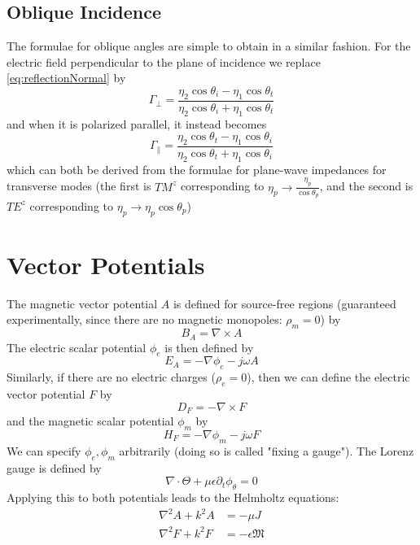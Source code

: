 \documentclass{article}
\begin{document}
\subsection{Oblique Incidence}
The formulae for oblique angles are simple to obtain in a similar fashion. For the electric field perpendicular to the plane of incidence we replace \eqref{eq:reflectionNormal} by
\begin{equation} \label{eq:reflectionObliquePerp}
    \Gamma_{\perp} = \frac{\eta_2 \cos \theta_i - \eta_1 \cos \theta_t }{\eta_2 \cos \theta_i + \eta_1 \cos \theta_t}
\end{equation}
and when it is polarized parallel, it instead becomes
\begin{equation} \label{eq:reflectionObliquePar}
    \Gamma_{\parallel} = \frac{\eta_2 \cos \theta_t - \eta_1 \cos \theta_i }{\eta_2 \cos \theta_t + \eta_1 \cos \theta_i}
\end{equation}
which can both be derived from the formulae for plane-wave impedances for transverse modes (the first is $TM^z$ corresponding to $\eta_p \to \frac{\eta_p}{\cos \theta_p}$, and the second is $TE^z$ corresponding to $\eta_p \to \eta_p \cos \theta_p $)
\newpage
\section{Vector Potentials}
The magnetic vector potential $A$ is defined for source-free regions (guaranteed experimentally, since there are no magnetic monopoles: $\rho_m = 0$) by
\begin{equation} \label{eq:magneticVectorPotential}
    B_A = \nabla \times A 
\end{equation}
The electric scalar potential $\phi_e$ is then defined by
\begin{equation} \label{eq:electricScalarPotential}
    E_A = - \nabla \phi_e -j \omega A 
\end{equation}
Similarly, if there are no electric charges ($\rho_e = 0$), then we can define the electric vector potential $F$ by
\begin{equation} \label{eq:electricVectorPotential}
    D_F = - \nabla \times F 
\end{equation}
and the magnetic scalar potential $\phi_m$ by
\begin{equation} \label{eq:magneticScalarPotential}
    H_F = - \nabla \phi_m -j \omega F 
\end{equation}
We can specify $\phi_e, \phi_m$ arbitrarily (doing so is called "fixing a gauge").
The Lorenz gauge is defined by
\begin{equation} \label{eq:LorenzGauge}
    \nabla \cdot \Theta + \mu \epsilon \partial_t \phi_{\theta} = 0 
\end{equation}
Applying this to both potentials leads to the Helmholtz equations:
\begin{subequations} \label{eq:Helmholtz}
    \begin{align}
        \nabla^2 A + k^2 A &= -\mu J \label{eq:HelmMag} \\
        \nabla^2 F + k^2 F &= -\epsilon \mathfrak{M} \label{eq:HelmElec}
    \end{align}
\end{subequations}
\end{document}

